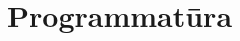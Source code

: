 \documentclass[hidelinks, a4paper, 12pt]{article}
\begin{document}
\section{Programmatūra}




\end{document}
